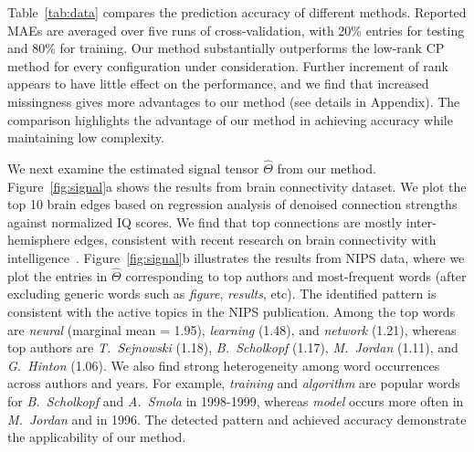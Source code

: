 \documentclass{article}
\theoremstyle{plain}
\theoremstyle{definition}
\begin{document}
\vspace{-.5cm}
Table~\ref{tab:data} compares the prediction accuracy of different methods. Reported MAEs are averaged over five runs of cross-validation, with 20\% entries for testing and 80\% for training. Our method substantially outperforms the low-rank CP method for every configuration under consideration. Further increment of rank appears to have little effect on the performance, and we find that increased missingness gives more advantages to our method (see details in Appendix). The comparison highlights the advantage of our method in achieving accuracy while maintaining low complexity. 


We next examine the estimated signal tensor $\hat \Theta$ from our method. Figure~\ref{fig:signal}a shows the results from brain connectivity dataset. We plot the top 10 brain edges based on regression analysis of denoised connection strengths against normalized IQ scores. We find that top connections are mostly inter-hemisphere edges, consistent with recent research on brain connectivity with intelligence~\cite{li2009brain,wang2017bayesian}. Figure~\ref{fig:signal}b illustrates the results from NIPS data, where we plot the entries in $\hat \Theta$ corresponding to top authors and most-frequent words (after excluding generic words such as \emph{figure}, \emph{results}, etc). The identified pattern is consistent with the active topics in the NIPS publication. Among the top words are \emph{neural} (marginal mean = 1.95), \emph{learning} (1.48), and \emph{network} (1.21), whereas top authors are \emph{T.\ Sejnowski} (1.18), \emph{B.~Scholkopf} (1.17), \emph{M.\ Jordan} (1.11), and \emph{G.\ Hinton} (1.06). We also find strong heterogeneity among word occurrences across authors and years. For example, \emph{training} and \emph{algorithm} are popular words for \emph{B.\ Scholkopf} and \emph{A.\ Smola} in 1998-1999, whereas \emph{model} occurs more often in \emph{M.\ Jordan} and in 1996. The detected pattern and achieved accuracy demonstrate the applicability of our method.
\end{document}
